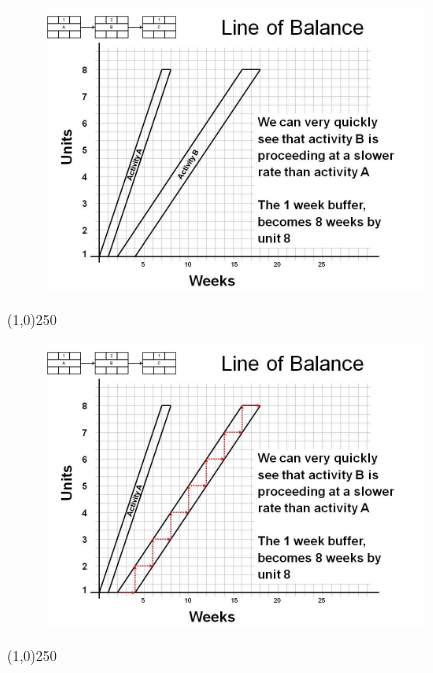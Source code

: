\begin{frame}
\begin{figure}
	\centering
		\includegraphics[width = 10.0cm]{oldnotes/Slide248.jpg}
\end{figure}
\end{frame}
\begin{center}\line(1,0){250}\end{center}






\begin{frame}
\begin{figure}
	\centering
		\includegraphics[width = 10.0cm]{oldnotes/Slide249.jpg}
\end{figure}
\end{frame}
\begin{center}\line(1,0){250}\end{center}






